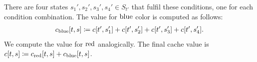 \begin{lemma}
\begin{description}
	\end{description}
	There are four states \( s_1', s_2', s_3', s_4' \in S_{t'} \)
	that fulfil these conditions, one for each condition combination.
	The value for \( \text{blue} \) color is computed as follows:
	\begin{align*}
		c_{\text{blue}}[t, s] & \coloneqq c[t', s_1'] + c[t', s_2'] + c[t', s_3'] + c[t', s_4']. \\
	\end{align*}
	We compute the value for \( \text{red} \) analogically.
	The final cache value is \( c[t, s] \coloneqq c_{\text{red}}[t, s] + c_{\text{blue}}[t, s] \).
\end{lemma}
%
